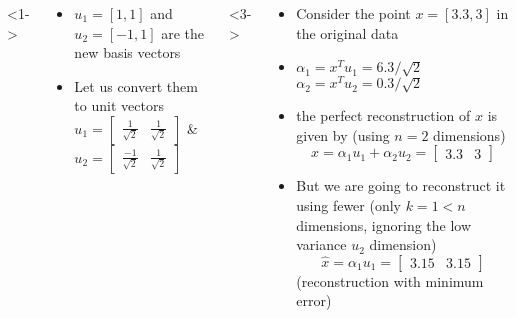 \begin{frame}
  \begin{columns}
    <1->
    \begin{overlayarea}{\textwidth}{\textheight}
      \makebox[\textwidth][c]{\usebox{\pcareconstructioncontent}}
      \begin{itemize}\justifying
        \item<1-> $u_1=[1,1]$ and $u_2=[-1,1]$ are the new basis vectors
        \item<2-> Let us convert them to unit vectors $u_1=\begin{bmatrix}
                  \frac{1}{\sqrt{2}} & \frac{1}{\sqrt{2}}
                \end{bmatrix}$
              \& $u_2=\begin{bmatrix}
                  \frac{-1}{\sqrt{2}} & \frac{1}{\sqrt{2}}
                \end{bmatrix}$


      \end{itemize}
    \end{overlayarea}

    <3->
    \begin{overlayarea}{\textwidth}{\textheight}
      \begin{itemize}\justifying
        \item<3-> Consider the point $x=[3.3,3]$ in the original data
        \item<4-> $\alpha_1 = x^Tu_1= {6.3}/{\sqrt{2}}$ \\
              $\alpha_2 = x^Tu_2= {0.3}/{\sqrt{2}}$
        \item<5-> the perfect reconstruction of $x$ is given by (using $n=2$ dimensions)
              \begin{equation*}
                x= \alpha_1 u_1 + \alpha_2 u_2 = \begin{bmatrix}3.3 & 3 \end{bmatrix}
              \end{equation*}
        \item<6-> But we are going to reconstruct it using fewer (only $k=1<n$ dimensions, ignoring the low variance $u_2$ dimension)
              \begin{equation*}
                \hat{x}=\alpha_1 u_1=\begin{bmatrix}3.15 & 3.15 \end{bmatrix}
              \end{equation*}
              (reconstruction with minimum error)
      \end{itemize}
    \end{overlayarea}
  \end{columns}
\end{frame}

